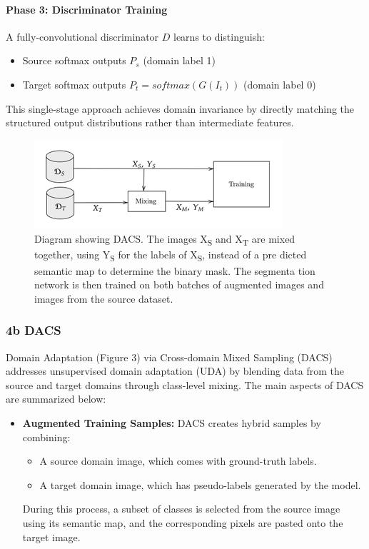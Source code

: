 \documentclass{article}
\begin{document}
\begin{multicols}{2}
\begin{itemize}
\end{itemize}  

\paragraph{Phase 3: Discriminator Training}  
A fully-convolutional discriminator $D$ learns to distinguish:  
\begin{itemize}  
	\item Source softmax outputs $P_s$ (domain label 1)  
	\item Target softmax outputs $P_t = {softmax}(G(I_t))$ (domain label 0)  
\end{itemize}  


This single-stage approach achieves domain invariance by directly matching the structured output distributions rather than intermediate features.  

\begin{figure}[H]
	\centering
	\includegraphics[width=1\linewidth]{image/DACS_structure.png}
	\caption{  Diagram showing DACS. The images X\textsubscript{S} and X\textsubscript{T} are
	mixed together, using Y\textsubscript{S} for the labels of X\textsubscript{S}, instead of a pre
   dicted semantic map to determine the binary mask. The segmenta
   tion network is then trained on both batches of augmented images
	and images from the source dataset.}
	\label{fig:DACS_image}
\end{figure}	

	\subsubsection{4b DACS}
	
	Domain Adaptation (Figure 3) via Cross-domain Mixed Sampling (DACS) \cite{tranheden2021dacs} addresses unsupervised domain adaptation (UDA) by blending data from the source and target domains through class-level mixing. The main aspects of DACS are summarized below:
	
	\begin{itemize}
		\item \textbf{Augmented Training Samples:} 
		DACS creates hybrid samples by combining:
		\begin{itemize}
			\item A source domain image, which comes with ground-truth labels.
			\item A target domain image, which has pseudo-labels generated by the model.
		\end{itemize}
		During this process, a subset of classes is selected from the source image using its semantic map, and the corresponding pixels are pasted onto the target image.
		

\end{itemize}
\end{multicols}
\end{document}
